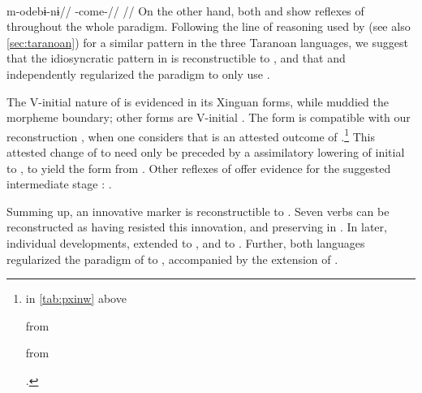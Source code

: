 \arara \parencite[][150]{alves2017arara}\\
\begingl
\gla m-odebɨ-nɨ//
\glb {}-come-//
\glft {}//
\endgl
\xe
%
On the other hand, both \ikpeng and \bakairi show reflexes of  throughout the whole paradigm.
Following the line of reasoning used by \textcite[114]{meira1998proto} (see also \cref{sec:taranoan}) for a similar pattern in the three Taranoan languages, we suggest that the idiosyncratic pattern in \arara is reconstructible to \PPek, and that \bakairi and \ikpeng independently regularized the paradigm to only use .

The V-initial nature of  is evidenced in its Xinguan forms, while \bakairi {} muddied the morpheme boundary; other forms are V-initial .
The \ikpeng form  is compatible with our reconstruction , when one considers that \ikpeng {} is an attested outcome of .\footnote{\begin{inlinelist}
 \item {}  in \cref{tab:pxinw} above
 \item {}  \parencite[24]{ikpengpacheco2001} from \PC {} \parencite[12]{gildea2007greenberg}
 \item {}  \parencite[98]{ikpengpacheco2001} from \PC {}
 \end{inlinelist}.}
This attested change of  to  need only be preceded by a assimilatory lowering of initial  to , to yield the form  from .
Other \ikpeng reflexes of  offer evidence for the suggested intermediate stage :   \parencite[25]{ikpengpacheco2001}.

Summing up, an innovative  marker  is reconstructible to \PPek.
Seven verbs can be reconstructed as having resisted this innovation, and preserving   in \PPek.
In later, individual developments, \bakairi extended  to , and \ikpeng to .
Further, both languages regularized the paradigm of  to , accompanied by the extension of .

